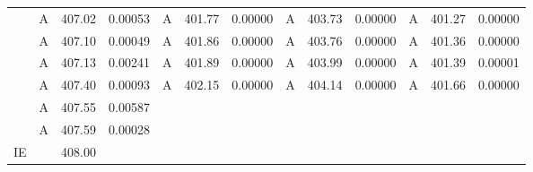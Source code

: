 \documentclass[journal=jctcce,manuscript=article]{achemso}
\begin{document}
\begin{table}
\begin{tabular}{l|lcc|lcc|lcc|lcc}
& A & 407.02 & 0.00053 & A & 401.77 & 0.00000 & A & 403.73 & 0.00000 & A & 401.27 & 0.00000 \\
& A & 407.10 & 0.00049 & A & 401.86 & 0.00000 & A & 403.76 & 0.00000 & A & 401.36 & 0.00000 \\
& A & 407.13 & 0.00241 & A & 401.89 & 0.00000 & A & 403.99 & 0.00000 & A & 401.39 & 0.00001 \\
& A & 407.40 & 0.00093 & A & 402.15 & 0.00000 & A & 404.14 & 0.00000 & A & 401.66 & 0.00000 \\
& A & 407.55 & 0.00587 &&&                    &&&                    &&&                    \\
& A & 407.59 & 0.00028 &&&                    &&&                    &&&                    \\

\hline
IE & & 408.00 
  \\
\hline
  \end{tabular}
\end{table}
\end{document}
